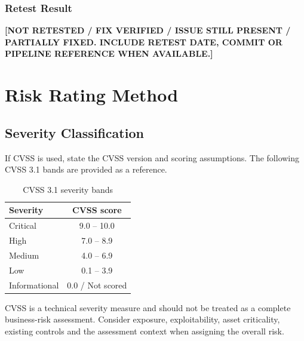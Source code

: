 \documentclass[11pt,a4paper]{report}
\newcommand{\placeholder}[1]{\textbf{[#1]}}
\begin{document}
\subsection{Retest Result}
\placeholder{NOT RETESTED / FIX VERIFIED / ISSUE STILL PRESENT / PARTIALLY FIXED.
INCLUDE RETEST DATE, COMMIT OR PIPELINE REFERENCE WHEN AVAILABLE.}


\chapter{Risk Rating Method}

\section{Severity Classification}
If CVSS is used, state the CVSS version and scoring assumptions. The following
CVSS 3.1 bands are provided as a reference.

\begin{table}[H]
\centering
\caption{CVSS 3.1 severity bands}
\begin{tabularx}{0.85\textwidth}{@{}Y c@{}}
    \toprule
    \textbf{Severity} & \textbf{CVSS score} \\
    \midrule
    Critical & 9.0 -- 10.0 \\
    High & 7.0 -- 8.9 \\
    Medium & 4.0 -- 6.9 \\
    Low & 0.1 -- 3.9 \\
    Informational & 0.0 / Not scored \\
    \bottomrule
\end{tabularx}
\end{table}

CVSS is a technical severity measure and should not be treated as a complete
business-risk assessment. Consider exposure, exploitability, asset criticality,
existing controls and the assessment context when assigning the overall risk.
\end{document}
